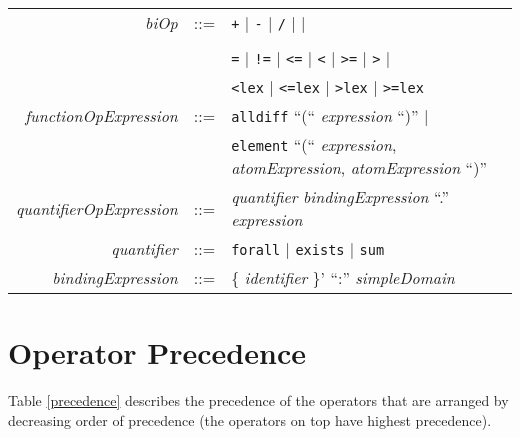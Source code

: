 \documentclass{article}
\begin{document}
\begin{tabular}{rcl}
\textit{biOp} & ::= & {\tt +} $\mid$ {\tt -}  $\mid$ {\tt /}  $\mid$ {\tt *}  $\mid$  \verb1^1  $\mid$ \\
              &     &  \verb1\/1  $\mid$ \verb1/\1  $\mid$ {\tt =>}  $\mid$ {\tt <=>}  $\mid$ \\
              &     & {\tt =}  $\mid$ {\tt !=}  $\mid$ {\tt <=}  $\mid$ {\tt <}  $\mid$ {\tt >=}  $\mid$ {\tt >} $\mid$ \\
              &     & {\tt <lex} $\mid$ {\tt <=lex} $\mid$ {\tt >lex} $\mid$ {\tt >=lex} \\
\textit{functionOpExpression} & ::= & \texttt{alldiff} ``(`` \textit{expression} ``)'' $\mid$ \\
                              &     & \texttt{element} ``(``
                              \textit{expression},
                               \textit{atomExpression},
                              \textit{atomExpression} ``)'' \\  
 \textit{quantifierOpExpression} & ::= & \textit{quantifier} \textit{bindingExpression} ``.'' \textit{expression} \\
\textit{quantifier} & ::= & \texttt{forall} $\mid$ \texttt{exists} $\mid$ \texttt{sum} \\ 
\textit{bindingExpression} & ::= & \{ \textit{identifier} \}' ``:'' \textit{simpleDomain} \\




\end{tabular}

\section{Operator Precedence}

Table \ref{precedence} describes the precedence of the operators that 
are arranged by decreasing order of precedence (the operators on top have highest precedence).
\end{document}
